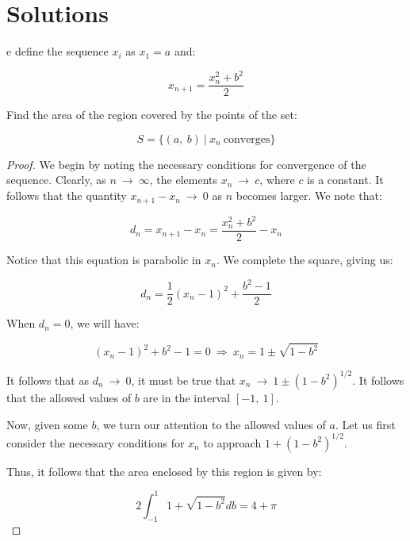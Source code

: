 \documentclass[10pt, oneside]{article}
\title{}
\author{Jack Ceroni}
\date{}
\newenvironment{problem}[2][Problem]{\begin{trivlist}
\item[\hskip \labelsep {\bfseries #1}\hskip \labelsep {\bfseries #2.}]}{\end{trivlist}}
\begin{document}
    \maketitle
    \tableofcontents

    \vspace{.25in}

    \section{Solutions}

    \begin{problem}
      We define the sequence $x_i$ as $x_1 = a$ and:

      $$x_{n + 1} = \frac{x_n^2 + b^2}{2}$$

      Find the area of the region covered by the points of the set:

      $$S = \{(a, \ b) \ | \ x_n \ \text{converges}\}$$
    \end{problem}

    \begin{proof}

      We begin by noting the necessary conditions for convergence of the sequence. Clearly, as $n \ \rightarrow \ \infty$,
      the elements $x_n \ \rightarrow \ c$, where $c$ is a constant. It follows that the quantity $x_{n + 1} - x_n \ \rightarrow \ 0$ as
      $n$ becomes larger. We note that:

      $$d_n = x_{n + 1} - x_{n} = \frac{x_n^2 + b^2}{2} - x_n$$

      Notice that this equation is parabolic in $x_n$. We complete the square, giving us:

      $$d_n = \frac{1}{2} (x_n - 1)^2 + \frac{b^2 - 1}{2}$$

      When $d_n = 0$, we will have:

      $$(x_n - 1)^2 + b^2 - 1 = 0 \ \Rightarrow \ x_n = 1 \pm \sqrt{1 - b^2}$$

      It follows that as $d_n \ \rightarrow \ 0$, it must be true that $x_n \ \rightarrow \ 1 \pm (1 - b^2)^{1/2}$. It follows
      that the allowed values of $b$ are in the interval $[-1, \ 1]$.
      \newline

      Now, given some $b$, we turn our attention to the allowed values of $a$. Let us first consider the necessary conditions for
      $x_n$ to approach $1 + (1 - b^2)^{1/2}$.
      \newline

      Thus, it follows that the area enclosed by this region is given by:

      $$2 \displaystyle\int_{-1}^{1} 1 + \sqrt{1 - b^2} db = 4 + \pi$$

      \end{proof}

    
\end{document}
